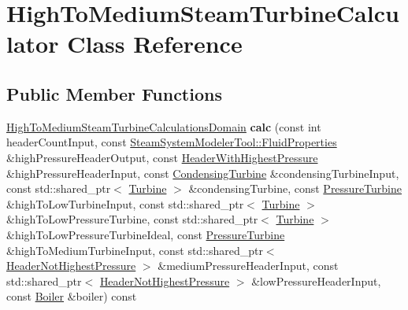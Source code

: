 \hypertarget{class_high_to_medium_steam_turbine_calculator}{}\section{High\+To\+Medium\+Steam\+Turbine\+Calculator Class Reference}
\label{class_high_to_medium_steam_turbine_calculator}
\subsection*{Public Member Functions}
\begin{DoxyCompactItemize}
\item 
\mbox{\label{class_high_to_medium_steam_turbine_calculator_a5cc5be18b84b9dd14a955b06c4d3ac5c}} 
\hyperlink{class_high_to_medium_steam_turbine_calculations_domain}{High\+To\+Medium\+Steam\+Turbine\+Calculations\+Domain} {\bfseries calc} (const int header\+Count\+Input, const \hyperlink{struct_steam_system_modeler_tool_1_1_fluid_properties}{Steam\+System\+Modeler\+Tool\+::\+Fluid\+Properties} \&high\+Pressure\+Header\+Output, const \hyperlink{class_header_with_highest_pressure}{Header\+With\+Highest\+Pressure} \&high\+Pressure\+Header\+Input, const \hyperlink{class_condensing_turbine}{Condensing\+Turbine} \&condensing\+Turbine\+Input, const std\+::shared\+\_\+ptr$<$ \hyperlink{class_turbine}{Turbine} $>$ \&condensing\+Turbine, const \hyperlink{class_pressure_turbine}{Pressure\+Turbine} \&high\+To\+Low\+Turbine\+Input, const std\+::shared\+\_\+ptr$<$ \hyperlink{class_turbine}{Turbine} $>$ \&high\+To\+Low\+Pressure\+Turbine, const std\+::shared\+\_\+ptr$<$ \hyperlink{class_turbine}{Turbine} $>$ \&high\+To\+Low\+Pressure\+Turbine\+Ideal, const \hyperlink{class_pressure_turbine}{Pressure\+Turbine} \&high\+To\+Medium\+Turbine\+Input, const std\+::shared\+\_\+ptr$<$ \hyperlink{class_header_not_highest_pressure}{Header\+Not\+Highest\+Pressure} $>$ \&medium\+Pressure\+Header\+Input, const std\+::shared\+\_\+ptr$<$ \hyperlink{class_header_not_highest_pressure}{Header\+Not\+Highest\+Pressure} $>$ \&low\+Pressure\+Header\+Input, const \hyperlink{class_boiler}{Boiler} \&boiler) const
\item 
\mbox{\label{class_high_to_medium_steam_turbine_calculator_a5cc5be18b84b9dd14a955b06c4d3ac5c}} 

\end{DoxyCompactItemize}
